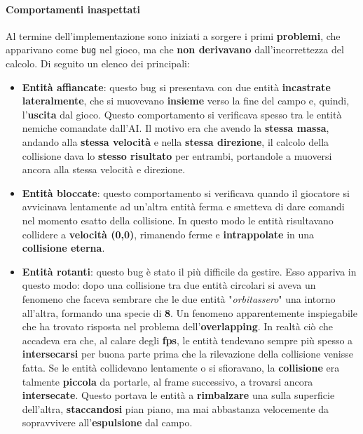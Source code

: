 \paragraph{Comportamenti inaspettati} Al termine dell'implementazione sono iniziati a sorgere i primi \textbf{problemi}, che apparivano come \texttt{bug} nel gioco, ma che \textbf{non derivavano} dall'incorrettezza del calcolo.
Di seguito un elenco dei principali:
\begin{itemize}
    \item \textbf{Entità affiancate}: questo bug si presentava con due entità \textbf{incastrate lateralmente}, che si muovevano \textbf{insieme} verso la fine del campo e, quindi, l'\textbf{uscita} dal gioco. Questo comportamento si verificava spesso tra le entità nemiche comandate dall'AI. Il motivo era che avendo la \textbf{stessa massa}, andando alla \textbf{stessa velocità} e nella \textbf{stessa direzione}, il calcolo della collisione dava lo \textbf{stesso risultato} per entrambi, portandole a muoversi ancora alla stessa velocità e direzione. 
    \item \textbf{Entità bloccate}: questo comportamento si verificava quando il giocatore si avvicinava lentamente ad un'altra entità ferma e smetteva di dare comandi nel momento esatto della collisione. In questo modo le entità risultavano collidere a \textbf{velocità (0,0)}, rimanendo ferme e \textbf{intrappolate} in una \textbf{collisione eterna}.
    \item \textbf{Entità rotanti}: questo bug è stato il più difficile da gestire. Esso appariva in questo modo: dopo una collisione tra due entità circolari si aveva un fenomeno che faceva sembrare che le due entità "\textit{orbitassero}" una intorno all'altra, formando una specie di \textbf{8}. Un fenomeno apparentemente inspiegabile che ha trovato risposta nel problema dell'\textbf{overlapping}. In realtà ciò che accadeva era che, al calare degli \textbf{fps}, le entità tendevano sempre più spesso a \textbf{intersecarsi} per buona parte prima che la rilevazione della collisione venisse fatta. Se le entità collidevano lentamente o si sfioravano, la \textbf{collisione} era talmente \textbf{piccola} da portarle, al frame successivo, a trovarsi ancora \textbf{intersecate}. Questo portava le entità a \textbf{rimbalzare} una sulla superficie dell'altra, \textbf{staccandosi} pian piano, ma mai abbastanza velocemente da sopravvivere all'\textbf{espulsione} dal campo.  
\end{itemize}

